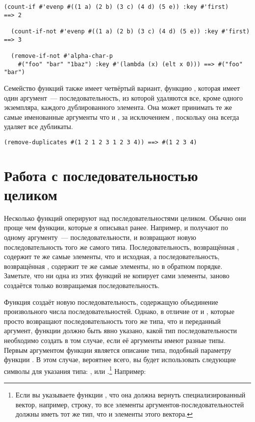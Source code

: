 \begin{lstlisting}[style=lisprepl]
  (count-if #'evenp #((1 a) (2 b) (3 c) (4 d) (5 e)) :key #'first)     ==> 2

  (count-if-not #'evenp #((1 a) (2 b) (3 c) (4 d) (5 e)) :key #'first) ==> 3

  (remove-if-not #'alpha-char-p
    #("foo" "bar" "1baz") :key #'(lambda (x) (elt x 0))) ==> #("foo" "bar")
\end{lstlisting}

Семейство функций  также имеет четвёртый вариант, функцию
, которая имеет один аргумент~--- последовательность, из которой
удаляются все, кроме одного экземпляра, каждого дублированного элемента.  Она может
принимать те же самые именованные аргументы что и , за исключением
, поскольку она всегда удаляет все дубликаты.

\begin{lstlisting}[style=lisprepl]
  (remove-duplicates #(1 2 1 2 3 1 2 3 4)) ==> #(1 2 3 4)
\end{lstlisting}

\section{Работа с последовательностью целиком}

Несколько функций оперируют над последовательностями целиком.  Обычно
они проще чем функции, которые я описывал ранее.  Например,
 и  получают по одному аргументу~--- последовательности, и
возвращают новую последовательность того же самого типа.  Последовательность, возвращённая
, содержит те же самые элементы, что и исходная,
а последовательность, возвращённая , содержит те же
самые элементы, но в обратном порядке.  Заметьте, что ни одна из этих функций не копирует
сами элементы, заново создаётся только возвращаемая последовательность.

Функция  создаёт новую последовательность, содержащую объединение произвольного
числа последовательностей.  Однако, в отличие от  и , которые
просто возвращают последовательность того же типа, что и переданный аргумент, функции
 должно быть явно указано, какой тип последовательности необходимо
создать в том случае, если её аргументы имеют разные типы.  Первым аргументом функции
является описание типа, подобный параметру  функции .
В этом случае, вероятнее всего, вы будет использовать следующие символы для указания типа:
,  или .\footnote{Если вы указываете функции
  , что она должна вернуть специализированный вектор, например, строку,
  то все элементы аргументов-последовательностей должны иметь тот же тип, что и элементы
  этого вектора.}  Например:

